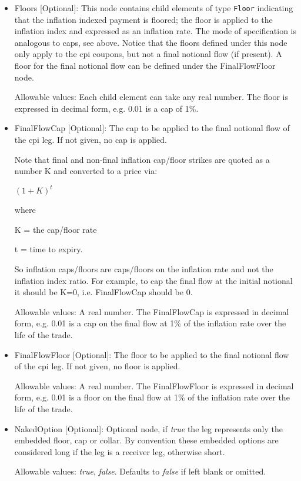 \begin{itemize}
\item Floors [Optional]: This node contains child elements of type
  \lstinline!Floor! indicating that the inflation indexed payment is
  floored; the floor is applied to the inflation index and expressed as
  an inflation rate. The mode of specification is analogous to caps, see
  above. Notice that the floors defined under this node only apply to the cpi coupons,
  but not a final notional flow (if present). A floor for the final notional flow can be defined
  under the FinalFlowFloor node.

Allowable values: Each child element can take any real number. The floor is
expressed in decimal form, e.g. 0.01 is a cap of 1\%.

\item FinalFlowCap [Optional]: The cap to be applied to the final notional flow of the cpi leg. If not given, no cap
  is applied.

Note that final and non-final inflation cap/floor strikes are quoted as a number K and converted to a price via:

$
(1+K)^t
$

 where

K = the cap/floor rate

t = time to expiry.

So inflation caps/floors are caps/floors on the inflation rate and not the inflation index ratio. For example, to cap the final flow at the initial notional  it should be K=0, i.e. FinalFlowCap should be 0.  


Allowable values: A real number. The FinalFlowCap is expressed in decimal form, e.g. 0.01 is a cap on the final flow at 1\% of the inflation rate over the life of the trade.


\item FinalFlowFloor [Optional]: The floor to be applied to the final notional flow of the cpi leg. If not given, no floor
  is applied.


Allowable values: A real number. The FinalFlowFloor is expressed in decimal form, e.g. 0.01 is a floor on the final flow at 1\% of the inflation rate over the life of the trade.

\item NakedOption [Optional]: Optional node, if \emph{true} the leg represents only the embedded floor, cap or collar. 
By convention these embedded options are considered long if the leg is a receiver leg, otherwise short. 
 
 Allowable values:  \emph{true}, \emph{false}. Defaults to \emph{false} if left blank or omitted.
 
\end{itemize} 

